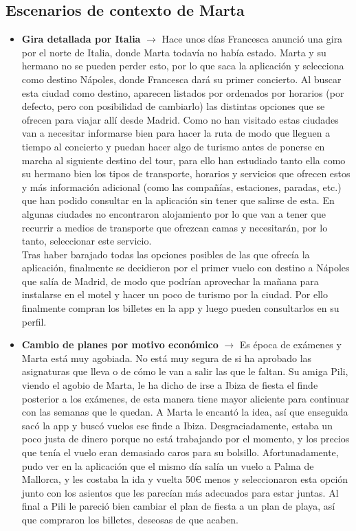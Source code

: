 \subsection{Escenarios de contexto de Marta}
\begin{itemize}
    \item \textbf{Gira detallada por Italia} $\rightarrow$ Hace unos días Francesca anunció una gira por el norte de Italia, donde Marta todavía no había estado. 
    Marta y su hermano no se pueden perder esto, por lo que saca la aplicación y selecciona como destino Nápoles, donde Francesca dará su primer concierto. 
    Al buscar esta ciudad como destino, aparecen listados por ordenados por horarios (por defecto, pero con posibilidad de cambiarlo) las distintas opciones 
    que se ofrecen para viajar allí desde Madrid. Como no han visitado estas ciudades van a necesitar informarse bien para hacer la ruta de modo que lleguen 
    a tiempo al concierto y puedan hacer algo de turismo antes de ponerse en marcha al siguiente destino del tour, para ello han estudiado tanto ella como su hermano 
    bien los tipos de transporte, horarios y servicios que ofrecen estos y más información adicional (como las compañías, estaciones, paradas, etc.) 
    que han podido consultar en la aplicación sin tener que salirse de esta. En algunas ciudades no encontraron alojamiento por lo que van a tener 
    que recurrir a medios de transporte que ofrezcan camas y necesitarán, por lo tanto, seleccionar este servicio. \\ 

    Tras haber barajado todas las opciones posibles de las que ofrecía la aplicación, finalmente se decidieron por el primer vuelo con destino a Nápoles 
    que salía de Madrid, de modo que podrían aprovechar la mañana para instalarse en el motel y hacer un poco de turismo por la ciudad. Por ello finalmente 
    compran los billetes en la app y luego pueden consultarlos en su perfil.
    
    \item \textbf{Cambio de planes por motivo económico} $\rightarrow$ Es época de exámenes y Marta está muy agobiada. No está muy segura de si ha aprobado 
    las asignaturas que lleva o de cómo le van a salir las que le faltan. Su amiga Pili, viendo el agobio de Marta, le ha dicho de irse a Ibiza de fiesta 
    el finde posterior a los exámenes, de esta manera tiene mayor aliciente para continuar con las semanas que le quedan. A Marta le encantó la idea, así 
    que enseguida sacó la app y buscó vuelos ese finde a Ibiza. Desgraciadamente, estaba un poco justa de dinero porque no está trabajando por el momento, 
    y los precios que tenía el vuelo eran demasiado caros para su bolsillo. Afortunadamente, pudo ver en la aplicación que el mismo día salía un vuelo a 
    Palma de Mallorca, y les costaba la ida y vuelta 50€ menos y seleccionaron esta opción junto con los asientos que les parecían más adecuados para estar 
    juntas. Al final a Pili le pareció bien cambiar el plan de fiesta a un plan de playa, así que compraron los billetes, deseosas de que acaben.
\end{itemize}
